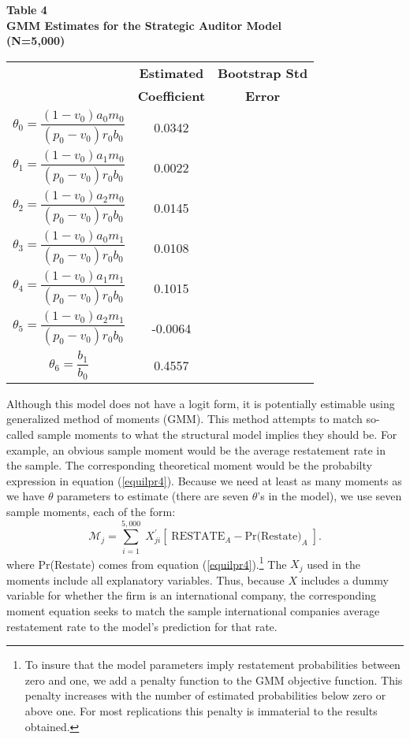 \begin{table}[t]
\begin{center}
{\bf Table 4} \\
{\bf GMM Estimates for the Strategic Auditor Model}\\ 
{\bf (N=5,000)} \\[1em]
\begin{tabular}{|c|cc|}
\hline
\T  &  {\bf Estimated}  & {\bf Bootstrap Std} \\ 
\B  & {\bf Coefficient} & {\bf Error} \\ \hline
\T $\theta_0= \dfrac{(1-v_0)a_0m_0}{(p_0-v_0)r_0b_0}$ & 0.0342 &\\[1.5em]
 $\theta_1=\dfrac{(1-v_0)a_1m_0}{(p_0-v_0)r_0b_0}$  &  0.0022 & \\[1.5em]
$\theta_2=\dfrac{(1-v_0)a_2m_0}{(p_0-v_0)r_0b_0}$  &  0.0145   & \\[1.5em]
$\theta_3=\dfrac{(1-v_0)a_0m_1}{(p_0-v_0)r_0b_0}$  &  0.0108  & \\[1.5em]
$\theta_4=\dfrac{(1-v_0)a_1m_1}{(p_0-v_0)r_0b_0}$ &  0.1015  &  \\[1.5em]
$\theta_5=\dfrac{(1-v_0)a_2m_1}{(p_0-v_0)r_0b_0}$ &  -0.0064  & \\[1.5em]
\B$\theta_6=\dfrac{b_1}{b_0}$ &  0.4557  & \\[1.6em]
\hline
\end{tabular}
\end{center}
\end{table}

Although this model does not have a logit form, it is potentially estimable using 
generalized method of moments (GMM). This method attempts to match so-called
sample moments to what the structural model implies they should be. For example,
an obvious sample moment would be the average restatement rate in the sample.
The corresponding theoretical moment would be the probabilty expression
in equation (\ref{equilpr4}). Because we need at least as many moments as
we have $\theta$ parameters to estimate (there are seven $\theta$'s in the model),
we use seven sample moments, each of the form:
$$ \mathcal{M}_j = \sum_{i=1}^{5,000} \; X_{ji}^\prime\left[\; \mbox{RESTATE}_A - \mbox{Pr(Restate)}_A \; \right]. $$
where Pr(Restate) comes from equation (\ref{equilpr4}).\footnote{To insure that the model parameters imply restatement probabilities
between zero and one, we add a penalty function to the GMM objective function.
This penalty increases with the number of estimated probabilities below zero or
above one. For most replications this penalty is immaterial to the results obtained.} The $X_j$ used in the moments include all explanatory variables. Thus, because $X$ includes  a dummy variable for whether the firm is an international company, the corresponding moment equation seeks to match the sample international companies average restatement rate to the model's prediction for that rate.

